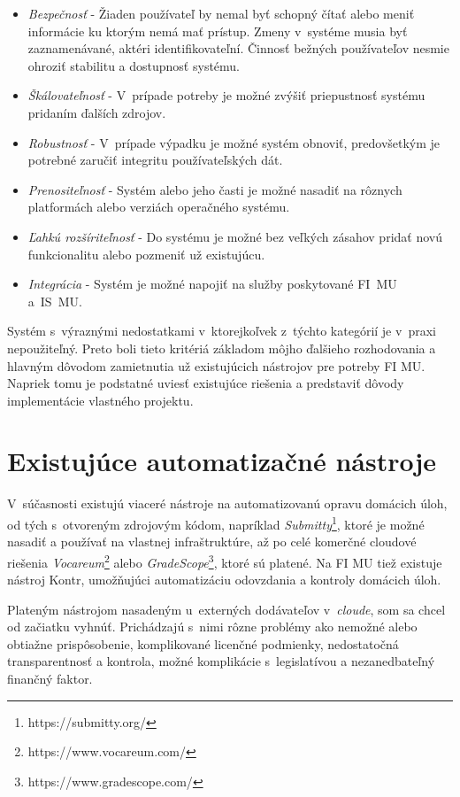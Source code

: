 \documentclass[
  digital, %
  oneside, %
  table,   %
  lof,     %
  lot,   %
]{fithesis3}
\begin{document}
\begin{itemize}
    \item \textit{Bezpečnosť} - Žiaden používateľ by nemal byť schopný čítať alebo meniť informácie ku ktorým nemá mať prístup. Zmeny v~systéme musia byť zaznamenávané, aktéri identifikovateľní. Činnosť bežných používateľov nesmie ohroziť stabilitu a dostupnosť systému.
    \item \textit{Škálovateľnosť} - V~prípade potreby je možné zvýšiť priepustnosť systému pridaním ďalších zdrojov.
    \item \textit{Robustnosť} - V~prípade výpadku je možné systém obnoviť, predovšetkým je potrebné zaručiť integritu používateľských dát.  
    \item \textit{Prenositeľnosť} - Systém alebo jeho časti je možné nasadiť na rôznych platformách alebo verziách operačného systému.
    \item \textit{Ľahkú rozšíriteľnosť} - Do systému je možné bez veľkých zásahov pridať novú funkcionalitu alebo pozmeniť už existujúcu.
    \item \textit{Integrácia} - Systém je možné napojiť na služby poskytované FI~MU a~IS~MU.
\end{itemize}

Systém s~výraznými nedostatkami v~ktorejkoľvek z~týchto kategórií je v~praxi nepoužiteľný. Preto boli tieto kritériá základom môjho ďalšieho rozhodovania a hlavným dôvodom zamietnutia už existujúcich nástrojov pre potreby FI MU. Napriek tomu je podstatné uviesť existujúce riešenia a predstaviť dôvody implementácie vlastného projektu.

\section{Existujúce automatizačné nástroje}

V~súčasnosti existujú viaceré nástroje na automatizovanú opravu domácich úloh, od tých s~otvoreným zdrojovým kódom, napríklad  \textit{Submitty}\footnote{https://submitty.org/}, ktoré je možné nasadiť a používať na vlastnej infraštruktúre, až po celé komerčné cloudové riešenia \textit{Vocareum}\footnote{https://www.vocareum.com/} alebo \textit{GradeScope}\footnote{https://www.gradescope.com/}, ktoré sú platené. Na FI MU tiež existuje nástroj Kontr, umožňujúci automatizáciu odovzdania a kontroly domácich úloh.

Plateným nástrojom nasadeným u~externých dodávateľov v~\emph{cloude}, som sa chcel od začiatku vyhnúť. Prichádzajú s~nimi rôzne problémy ako nemožné alebo obtiažne prispôsobenie, komplikované licenčné podmienky, nedostatočná transparentnosť a kontrola, možné komplikácie s~legislatívou a nezanedbateľný finančný faktor.
\end{document}
